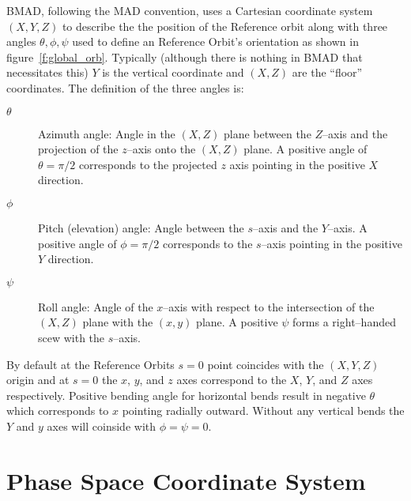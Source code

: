BMAD, following the MAD convention, uses a Cartesian coordinate system
$(X, Y, Z)$ to describe the the position of the Reference orbit along
with three angles $\theta, \phi, \psi$ used to define an Reference
Orbit's orientation as shown in figure~\ref{f:global_orb}. Typically
(although there is nothing in BMAD that necessitates this) $Y$ is the
vertical coordinate and $(X, Z)$ are the ``floor'' coordinates. 
The definition of the three angles is:
\begin{description}
\item[$\theta$] Azimuth angle: Angle in the $(X, Z)$ plane 
between the $Z$--axis and the projection of the $z$--axis onto the
$(X, Z)$ plane. A positive angle of $\theta = \pi/2$ corresponds to the
projected $z$ axis pointing in the positive $X$ direction.
\item[$\phi$] Pitch (elevation) angle: Angle between the $s$--axis 
and the $Y$--axis. A positive angle of $\phi = \pi/2$ corresponds to
the $s$--axis pointing in the positive $Y$ direction.
\item[$\psi$] Roll angle: Angle of the $x$--axis with respect 
to the intersection of the $(X, Z)$ plane with the $(x, y)$ plane. A
positive $\psi$ forms a right--handed scew with the $s$--axis.
\end{description}

By default at the Reference Orbits $s = 0$ point coincides with the
$(X, Y, Z)$ origin and at $s = 0$ the $x$, $y$, and $z$ axes
correspond to the $X$, $Y$, and $Z$ axes respectively. Positive
bending angle for horizontal bends result in negative $\theta$ which
corresponds to $x$ pointing radially outward. Without any vertical
bends the $Y$ and $y$ axes will coinside with $\phi = \psi = 0$. 

\section{Phase Space Coordinate System}

